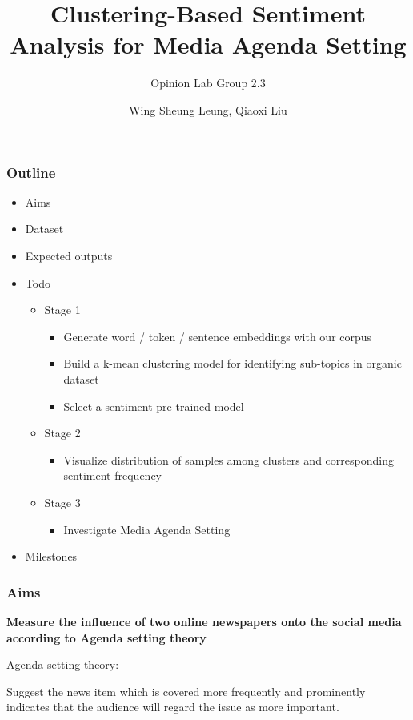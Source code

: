\documentclass{tum-presentation}
\title[Shortened Title]{Clustering-Based Sentiment Analysis for Media Agenda Setting}
\subtitle{Opinion Lab Group 2.3}
\author{Wing Sheung Leung, Qiaoxi Liu}
\begin{document}
\begin{frame}[noframenumbering]
  \titlepage
\end{frame}

\begin{frame}
  \frametitle{Outline}
  \large
  \begin{itemize}
  \item Aims
  \item Dataset
  \item Expected outputs
  \item Todo
    \begin{itemize}
        \item Stage 1
        \begin{itemize}\normalsize
            \item Generate word / token / sentence embeddings with our corpus
            \item Build a k-mean clustering model for identifying sub-topics in organic dataset
            \item Select a sentiment pre-trained model
        \end{itemize}
        \item Stage 2
        \begin{itemize}\normalsize
            \item Visualize distribution of samples among clusters and corresponding sentiment frequency
        \end{itemize}
        \item Stage 3
        \begin{itemize}\normalsize
            \item Investigate Media Agenda Setting
        \end{itemize}
    \end{itemize}
  \item Milestones
  \end{itemize}

\end{frame}

\begin{frame}
  \frametitle{Aims}
  \large
  \begin{description}
    \item \textbf{Measure the influence of two online newspapers onto the social media according to Agenda setting theory}
    \vspace{1cm}
    \item \underline{Agenda setting theory}:
    \item Suggest the news item which is covered more frequently and prominently indicates that the audience will regard the issue as more important.
  \end{description}
\end{frame}
\end{document}
